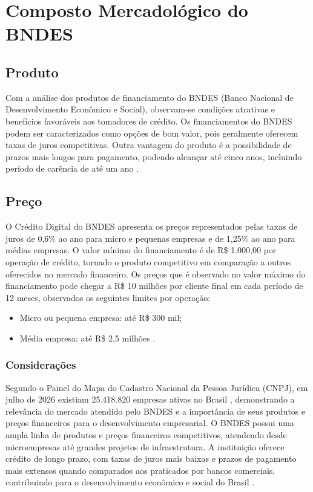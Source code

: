 \chapter{Composto Mercadológico do BNDES}

\section{Produto}

Com a análise dos produtos de financiamento do BNDES (Banco Nacional de Desenvolvimento Econômico e Social), observam-se condições atrativas e benefícios favoráveis aos tomadores de crédito. Os financiamentos do BNDES podem ser caracterizados como opções de bom valor, pois geralmente oferecem taxas de juros competitivas. Outra vantagem do produto é a possibilidade de prazos mais longos para pagamento, podendo alcançar até cinco anos, incluindo período de carência de até um ano \cite{bndes2026creditodigital}.

\section{Preço}

O Crédito Digital do BNDES apresenta os preços representados pelas taxas de juros de 0,6\% ao ano para micro e pequenas empresas e de 1,25\% ao ano para médias empresas. O valor mínimo do financiamento é de R\$ 1.000,00 por operação de crédito, tornado o produto competitivo em comparação a outros oferecidos no mercado financeiro. Os preços que é observado no valor máximo do financiamento pode chegar a R\$ 10 milhões por cliente final em cada período de 12 meses, observados os seguintes limites por operação:

\begin{itemize}
  \item Micro ou pequena empresa: até R\$ 300 mil;
  \item Média empresa: até R\$ 2,5 milhões \cite{bndes2026creditodigital}.
\end{itemize}

\subsection{Considerações}

Segundo o Painel do Mapa do Cadastro Nacional da Pessoa Jurídica (CNPJ), em julho de 2026 existiam 25.418.820 empresas ativas no Brasil \cite{mdic2026mapacnpj}, demonstrando a relevância do mercado atendido pelo BNDES e a importância de seus produtos e preços financeiros para o desenvolvimento empresarial. O BNDES possui uma ampla linha de produtos e preços financeiros competitivos, atendendo desde microempresas até grandes projetos de infraestrutura. A instituição oferece crédito de longo prazo, com taxas de juros mais baixas e prazos de pagamento mais extensos quando comparados aos praticados por bancos comerciais, contribuindo para o desenvolvimento econômico e social do Brasil \cite{bndes2025estatuto, bndes2026oib}.

